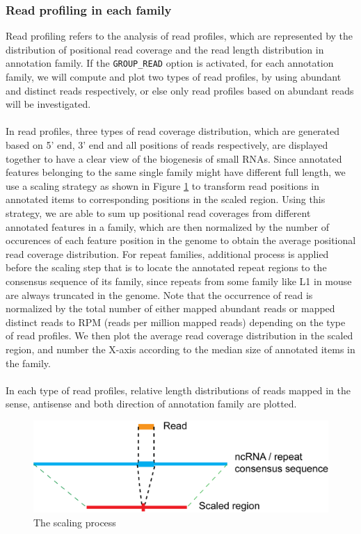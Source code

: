 \documentclass[12pt]{article}
\begin{document}
\subsubsection{Read profiling in each family}
\label{subsubsection:readprofile}
Read profiling refers to the analysis of read profiles, which are represented by the distribution of positional read coverage and the read length distribution in annotation family. If the \verb+GROUP_READ+ option is activated,  for each annotation family, we will compute and plot two types of read profiles, by using abundant and distinct reads respectively, or else only read profiles based on abundant reads will be investigated. \\\\
In read profiles, three types of read coverage distribution, which are generated based on 5' end, 3' end and all positions of reads respectively, are displayed together to have a clear view of the biogenesis of small RNAs. Since annotated features belonging to the same single family might have different full length, we use a scaling strategy as shown in Figure \ref{fig:scaling} to transform read positions in annotated items to corresponding positions in the scaled region. Using this strategy, we are able to sum up positional read coverages from different annotated features in a family, which are then normalized by the number of occurences of each feature position in the genome to obtain the average positional read coverage distribution. For repeat families, additional process is applied before the scaling step that is to locate the annotated repeat regions to the consensus sequence of its family, since repeats from some family like L1 in mouse are always truncated in the genome.  Note that the occurrence of read is normalized by the total number of either mapped abundant reads or mapped distinct reads to RPM (reads per million mapped reads) depending on the type of read profiles. We then plot the average read coverage distribution in the scaled region, and number the X-axis according to the median size of annotated items in the family.\\\\
In each type of read profiles, relative length distributions of reads mapped in the sense, antisense and both direction of annotation family are plotted.

\begin{figure}[h!]
\begin{center}
 \includegraphics[width=160mm]{scaling.png}
\end{center}
\caption{The scaling process}
\label{fig:scaling}
\end{figure} 
\end{document}
